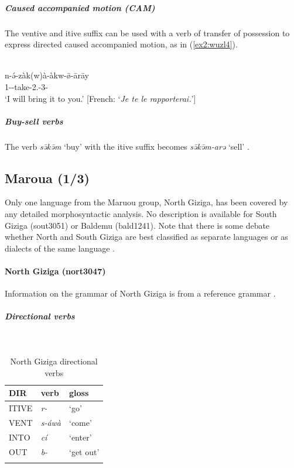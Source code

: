 \subparagraph{Caused accompanied motion (CAM)}

The ventive and itive suffix can  be used with a verb of transfer of possession to express directed caused accompanied motion, as in (\ref{ex2:wuzl4}). 

\ea\label{ex2:wuzl4}
 \\
\gll n-ə́-zàk(w)à-àkw-ø̄-ārāy \\
1--take-2.-3- \\
\glt `I will bring it to you.' [French: `\textit{Je te le rapporterai.}']
\z 

\subparagraph{Buy-sell verbs}

The verb \textit{sə̄kə̄m} `buy' with the itive suffix becomes \textit{sə̄kə̄m-arə} `sell' \citep[162]{colombelLangueOuldemeNordCameroun2005}. 

\subsection{Maroua (1/3)}

Only one language from the Maruou group, North Giziga, has been covered by any detailed morphosyntactic analysis. No description is available for South Giziga (sout3051) or Baldemu (bald1241). Note that there is some debate whether North and South Giziga are best classified as separate languages or as dialects of the same language \citep[2--3]{shayGrammarGizigaChadic2021}.  

\paragraph*{North Giziga (nort3047)} \label{gizi}

Information on the grammar of North Giziga is from a reference grammar \citep{shayGrammarGizigaChadic2021}.

\subparagraph{Directional verbs}~

\begin{table}[H]
	\caption{North Giziga directional verbs} 
	\label{tab:giziV}
	\begin{tabular}{lll} %
		\lsptoprule
		DIR & verb & gloss   \\ %
		\midrule
		ITIVE & \textit{r-} & `go' \\
		VENT & \textit{s-áwà} & `come' \\
		INTO& \textit{cí} & `enter' \\
		OUT &\textit{b-} & `get out' \\
		\lspbottomrule
	\end{tabular}
\end{table}

